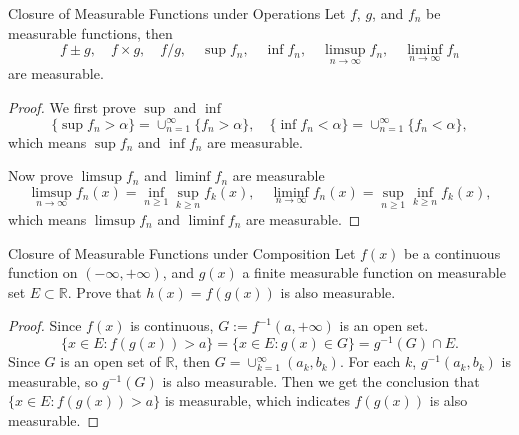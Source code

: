\begin{proposition}{Closure of Measurable Functions under Operations}{}
  Let $f$, $g$, and $f_n$ be measurable functions, then
  \begin{equation}
    f \pm g, \quad f \times g, \quad f / g, \quad \sup f_n, \quad \inf f_n, \quad
    \limsup \limits_{n \rightarrow \infty}f_n, \quad
    \liminf \limits_{n \rightarrow \infty}f_n
  \end{equation}
  are measurable.
\end{proposition}

\begin{proof}
  We first prove $\sup$ and $\inf$
  \begin{equation}
    \{\sup f_n > \alpha\} = \cup _{n = 1}^{\infty} \{f_n > \alpha\}, \quad
    \{\inf f_n < \alpha\} = \cup _{n = 1}^{\infty} \{f_n < \alpha\},
  \end{equation}
  which means $\sup f_n$ and $\inf f_n$ are measurable.

  Now prove $\limsup f_n$ and $\liminf f_n$ are measurable
  \begin{equation}
    \limsup _{n \rightarrow \infty} f_n(x) = \inf_{n \geq 1} \sup_{k \geq n}f_k(x),
    \quad
    \liminf _{n \rightarrow \infty} f_n(x) = \sup _{n \geq 1} \inf_{k \geq n}f_k(x),
  \end{equation}
  which means $\limsup f_n$ and $\liminf f_n$ are measurable.
\end{proof}

\begin{example}{Closure of Measurable Functions under Composition}{}
  Let $f(x)$ be a continuous function on $(-\infty, +\infty)$,
  and $g(x)$ a finite measurable function on measurable set $E \subset \mathbb{R}$.
  Prove that $h(x) = f(g(x))$ is also measurable.
\end{example}

\begin{proof}
  Since $f(x)$ is continuous, $G := f^{-1}(a, +\infty)$ is an open set.
  \begin{equation}
    \{x \in E: f(g(x)) > a\} = \{x \in E: g(x) \in G\} = g^{-1}(G) \cap E.
  \end{equation}
  Since $G$ is an open set of $\mathbb{R}$, then $G = \cup _{k = 1}^{\infty}(a_k, b_k)$.
  For each $k$, $g^{-1}(a_k, b_k)$ is measurable, so $g^{-1}(G)$ is also measurable.
  Then we get the conclusion that $\{x \in E: f(g(x)) > a\}$ is measurable,
  which indicates $f(g(x))$ is also measurable.
\end{proof}

